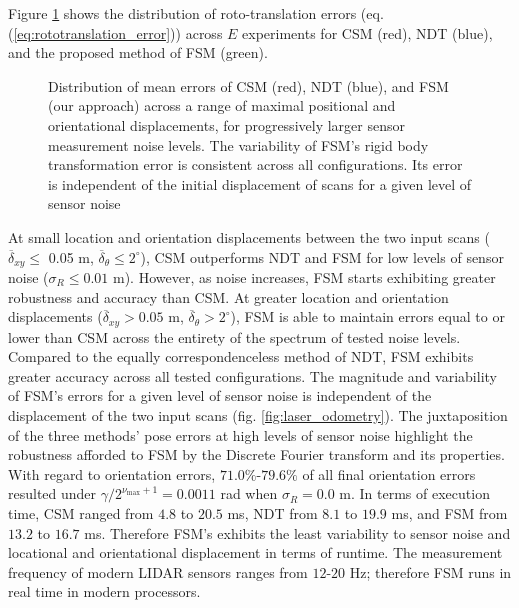 Figure \ref{fig:errors_sm} shows the distribution of roto-translation errors
(eq. (\ref{eq:rototranslation_error})) across $E$ experiments for CSM (red),
NDT (blue), and the proposed method of FSM (green).

\begin{figure}[]\centering
  \vspace{-1.5cm}
  
  \vspace{-1.5cm}
  \caption{\small Distribution of mean errors of CSM (red), NDT (blue), and
           FSM (our approach) across a range of maximal positional and
           orientational displacements, for progressively larger sensor
           measurement noise levels. The variability of FSM's rigid body
           transformation error is consistent across all configurations. Its
           error is independent of the initial displacement of scans for a
           given level of sensor noise}
  \label{fig:errors_sm}
\end{figure}

At small location and orientation displacements between the two input scans
($\overline{\delta}_{xy} \leq $ 0.05 m,
$\overline{\delta}_\theta \leq 2^\circ$), CSM outperforms NDT and FSM for low
levels of sensor noise ($\sigma_R \leq 0.01$ m). However, as noise increases,
FSM starts exhibiting greater robustness and accuracy than CSM. At greater
location and orientation displacements
($\overline{\delta}_{xy} > 0.05$ m, $\overline{\delta}_\theta > 2^\circ$), FSM
is able to maintain errors equal to or lower than CSM across the entirety of
the spectrum of tested noise levels. Compared to the equally
correspondenceless method of NDT, FSM exhibits greater accuracy across all
tested configurations. The magnitude and variability of FSM's errors for a
given level of sensor noise is independent of the displacement of the two input
scans (fig. \ref{fig:laser_odometry}). The juxtaposition of the three methods'
pose errors at high levels of sensor noise highlight the robustness afforded to
FSM by the Discrete Fourier transform and its properties. With regard to
orientation errors, $71.0\%$-$79.6\%$ of all final orientation errors resulted
under $\gamma / 2^{\nu_{\max}+1} = 0.0011$ rad when $\sigma_R = 0.0$ m. In terms
of execution time, CSM ranged from $4.8$ to $20.5$ ms, NDT from $8.1$ to $19.9$
ms, and FSM from $13.2$ to $16.7$ ms. Therefore FSM's exhibits the least
variability to sensor noise and locational and orientational displacement in
terms of runtime.  The measurement frequency of modern LIDAR sensors ranges
from $12$-$20$ Hz; therefore FSM runs in real time in modern processors.
